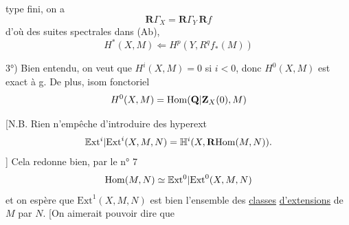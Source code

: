 type fini, on a
\[
\mathbf{R}\Gamma_X=\mathbf{R}\Gamma_Y\,\mathbf{R}f
\]
d'où des suites spectrales dans (Ab),
\[
H^*(X,M)\Longleftarrow H^p(Y,R^qf_*(M))
\]

3°) Bien entendu, on veut que $H^i(X,M)=0$ si $i<0$, donc $H^0(X,M)$ est exact à g. De plus, isom fonctoriel
\[
H^0(X,M)=\mathrm{Hom}(\mathbf{Q}|\mathbf{Z}_X(0),M)
\]

[N.B. Rien n'empêche d'introduire des hyperext
\[
\mathbb{E}\mathrm{xt}^i|\mathrm{Ext}^i(X,M,N)=\mathbb{H}^i(X,\mathbf{R}\mathrm{Hom}(M,N)).
\]
]
Cela redonne bien, par le n° 7
\[
\mathrm{Hom}(M,N)\simeq\mathbb{E}\mathrm{xt}^0|\mathrm{Ext}^0(X,M,N)
\]
et on espère que $\mathrm{Ext}^1(X,M,N)$ est bien l'ensemble des \uline{classes} \uline{d'extensions} de $M$ par $N$. [On aimerait pouvoir dire que
